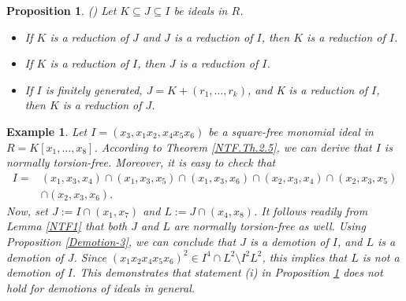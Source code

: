 \documentclass[11pt]{amsart}
\newtheorem{proposition}[theorem]{Proposition}
\newtheorem{example}[theorem]{Example}
\begin{document}

\begin{proposition}(\cite[Proposition 1.2.4]{HS}) \label{reduction-1}
Let $K \subseteq J \subseteq I$ be ideals in $R$. 
\begin{itemize}
\item[(i)] If $K$ is a reduction of $J$ and $J$ is a reduction of $I$, then $K$ is a reduction of $I$.
\item[(ii)] If $K$ is a reduction of $I$, then $J$ is a reduction of $I$.
\item[(iii)] If $I$ is finitely generated, $J = K + (r_1, \ldots, r_k)$, and K is a reduction of   $I$, then $K$ is a reduction of $J$.
\end{itemize}
\end{proposition}



\begin{example}\label{Example-2}
\em{
Let $I=(x_3,x_1x_2,x_4x_5x_6)$ be a square-free monomial ideal in $R=K[x_1, \ldots, x_8]$. According to Theorem  \ref{NTF.Th.2.5}, we can derive that $I$ is normally torsion-free. Moreover, it is easy to check that 
\begin{align*}
I=& (x_1,x_3,x_4) \cap (x_1,x_3,x_5) \cap(x_1,x_3,x_6) \cap (x_2,x_3,x_4)  \cap (x_2,x_3,x_5)\\
& \cap(x_2,x_3,x_6).
\end{align*}
Now, set $J:=I\cap (x_1,x_7)$  and $L:=J\cap (x_4,x_8)$. It follows readily from Lemma \ref{NTF1} that both $J$ and $L$ are normally torsion-free as well. 
 Using Proposition \ref{Demotion-3}, we can conclude that  $J$ is  a demotion of $I$, and  $L$ is  a demotion of $J$. Since 
 $(x_1x_2x_4x_5x_6)^2 \in I^4\cap L^2 \setminus I^2L^2$, this implies that   $L$ is not a demotion of $I$. 
  This demonstrates that statement (i) in Proposition \ref{reduction-1} does not hold for demotions of ideals in general.
}
\end{example}



\end{document}
